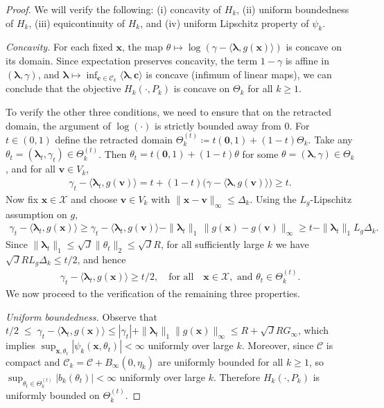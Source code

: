 \documentclass{article}
\theoremstyle{plain}
\theoremstyle{definition}
\newcommand{\calC}{\mathcal C}
\newcommand{\calX}{\mathcal X}
\newcommand{\cvec}{\mathbf{c}}
\newcommand{\vvec}{\mathbf{v}}
\newcommand{\xvec}{\mathbf{x}}
\newcommand{\qtext}[1]{\quad \text{#1} \quad}
\newcommand{\boldlambda}{\boldsymbol{\lambda}}
\begin{document}
\begin{proof} We will verify the following: (i) concavity of $H_k$, (ii) uniform boundedness of $H_k$, (iii) equicontinuity of $H_k$, and (iv) uniform Lipschitz property of $\psi_k$. 


\emph{Concavity.} For each fixed $\xvec$, the map $\theta\mapsto \log(\gamma-\langle \boldlambda,g(\xvec)\rangle)$ is concave on its domain. Since expectation preserves concavity, the term $1-\gamma$ is affine in $(\boldlambda, \gamma)$, and
$\boldlambda\mapsto \inf_{\cvec\in\calC_k}\langle \boldlambda,\cvec\rangle$ is concave (infimum of linear maps), we can conclude that the objective $H_k(\cdot,P_k)$ is concave on $\Theta_k$ for all $k \geq 1$.

To verify the other three conditions, we need to ensure that on the retracted domain, the argument of $\log(\cdot)$ is strictly bounded away from $0$.  For $t\in(0,1)$ define the retracted domain $\Theta_k^{(t)}\coloneqq t(\boldsymbol{0},1)+(1-t)\Theta_k$.
Take any $\theta_t=(\boldlambda_t,\gamma_t)\in\Theta_k^{(t)}$. Then $\theta_t=t(\boldsymbol{0},1)+(1-t)\theta$ for some $\theta=(\boldlambda,\gamma)\in\Theta_k$, and for all $\vvec\in V_k$,
\begin{align}
\gamma_t-\langle \boldlambda_t,g(\vvec)\rangle
= t+(1-t)\big(\gamma-\langle \boldlambda,g(\vvec)\rangle\big)\ge t.
\end{align}
Now fix $\xvec\in\calX$ and choose $\vvec\in V_k$ with $\|\xvec-\vvec\|_\infty\le \Delta_k$. Using the $L_g$-Lipschitz assumption on $g$,
\begin{align}
\gamma_t-\langle \boldlambda_t,g(\xvec)\rangle \ge \gamma_t-\langle \boldlambda_t,g(\vvec)\rangle - \|\boldlambda_t\|_1\,\|g(\xvec)-g(\vvec)\|_\infty \ge t - \|\boldlambda_t\|_1 L_g\Delta_k.
\end{align}
Since $\|\boldlambda_t\|_1\le \sqrt{J}\|\theta_t\|_2\le \sqrt{J}R$, for all sufficiently large $k$ we have $\sqrt{J}R L_g\Delta_k\le t/2$, and hence
\begin{align}
\gamma_t-\langle \boldlambda_t,g(\xvec)\rangle \ge t/2, \qtext{for all} \xvec\in\calX,\text{ and } \theta_t\in\Theta_k^{(t)}.
\end{align}
We now proceed to the verification of the remaining three properties. 

\emph{Uniform boundedness.}
Observe that  $t/2 \; \leq \;\gamma_t-\langle \boldlambda_t,g(\xvec)\rangle \leq |\gamma_t|+\|\boldlambda_t\|_1\|g(\xvec)\|_\infty \leq R+\sqrt{J}R G_\infty$, which implies 
 $\sup_{\xvec,\theta_t}|\psi_k(\xvec,\theta_t)|<\infty$ uniformly over large $k$. Moreover,  since $\calC$ is compact and $\calC_k=\calC+B_\infty(0,\eta_k)$ are uniformly bounded for all $k \geq 1$, so
$\sup_{\theta_t\in\Theta_k^{(t)}}|b_k(\theta_t)|<\infty$ uniformly over large $k$.
Therefore $H_k(\cdot,P_k)$ is uniformly bounded on $\Theta_k^{(t)}$.


\end{proof}
\end{document}
